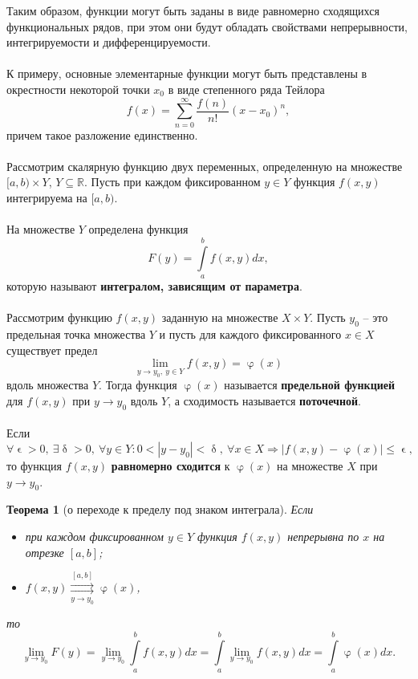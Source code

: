 \documentclass[a4paper, 12pt]{report}
\numberwithin{equation}{section}
\renewcommand{\leq}{\leqslant}
\renewcommand{\delta}{\updelta}
\renewcommand{\varphi}{\upvarphi}
\renewcommand{\epsilon}{\upvarepsilon}
\newtheorem*{theorem}{Теорема}
\begin{document}
	\noindent 
	Таким образом, функции могут быть заданы в виде равномерно сходящихся функциональных рядов, при этом они будут обладать свойствами непрерывности, интегрируемости и дифференцируемости.\\\\
	К примеру, основные элементарные функции могут быть представлены в окрестности некоторой точки $x_0$ в виде степенного ряда Тейлора
	\begin{equation}
		f(x) = \sum_{n=0}^\infty \dfrac{f{(n)}}{n!}(x-x_0)^n,
	\end{equation}
	причем такое разложение единственно.
	\\\\
	Рассмотрим скалярную функцию двух переменных, определенную на множестве $[a,b)\times Y$, $Y \subseteq \mathbb R$. Пусть при каждом фиксированном $y \in Y$ функция $f(x,y)$ интегрируема на $[a,b)$. 
	\\\\
	{На множестве $Y$ определена функция 
		\begin{equation}
			F(y) = \int\limits_a^b f(x,y)dx,
		\end{equation}
		которую называют \textbf{интегралом, зависящим от параметра}.}
	\\\\
	Рассмотрим функцию $f(x,y)$ заданную на множестве $X \times Y$. Пусть $y_0$ -- это предельная точка множества $Y$ и пусть для каждого фиксированного $x\in X$ существует предел
	\begin{equation}
		\lim\limits_{y \to y_0,\ y \in Y} f(x,y) = \varphi(x)
	\end{equation}
	вдоль множества $Y$. 
	{Тогда функция $\varphi(x)$ называется \textbf{предельной функцией} для $f(x,y)$ при $y \to y_0$ вдоль $Y$, а сходимость называется \textbf{поточечной}.}
	\\\\
	{Если 
		\begin{equation}
			\forall \epsilon > 0,\ \exists \delta > 0,\ \forall y \in Y : 0 < |y-y_0|<\delta,\ \forall x \in X \Rightarrow |f(x,y) - \varphi(x) | \leq \epsilon,
		\end{equation}
		то функция $f(x,y)$ \textbf{равномерно сходится} к $\varphi(x)$ на множестве $X$ при $y \to y_0$.}
	\begin{theorem}
		[о переходе к пределу под знаком интеграла]
		Если 
		\begin{itemize}
			\item при каждом фиксированном $y \in Y$ функция $f(x,y)$ непрерывна по $x$ на отрезке $[a,b]$;
			\item $f(x,y) \underset{y\to y_0}{\overset{[a,b]}{\rightrightarrows}}\varphi(x)$,
		\end{itemize} то
		\begin{equation}
			\lim\limits_{y \to y_0} F(y) = \lim\limits_{y \to y_0}\int\limits_a^b f(x,y)dx = \int\limits_a^b\lim\limits_{y \to y_0} f(x,y)dx = \int\limits_a^b \varphi(x)dx.
		\end{equation}
	\end{theorem}
\end{document}
